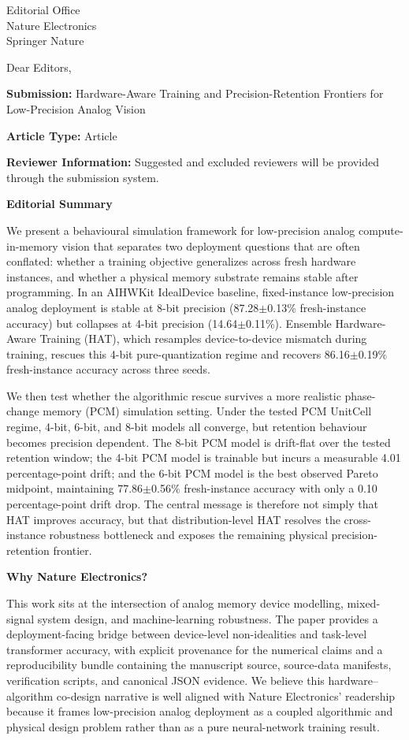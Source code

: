 \documentclass[11pt,a4paper]{letter}
\begin{document}
\begin{letter}{Editorial Office\\Nature Electronics\\Springer Nature}

\opening{Dear Editors,}

\textbf{Submission:} Hardware-Aware Training and Precision-Retention Frontiers for Low-Precision Analog Vision

\textbf{Article Type:} Article

\textbf{Reviewer Information:} Suggested and excluded reviewers will be provided through the submission system.

\vspace{0.5em}
\textbf{Editorial Summary}

We present a behavioural simulation framework for low-precision analog compute-in-memory vision that separates two deployment questions that are often conflated: whether a training objective generalizes across fresh hardware instances, and whether a physical memory substrate remains stable after programming. In an AIHWKit IdealDevice baseline, fixed-instance low-precision analog deployment is stable at 8-bit precision (87.28$\pm$0.13\% fresh-instance accuracy) but collapses at 4-bit precision (14.64$\pm$0.11\%). Ensemble Hardware-Aware Training (HAT), which resamples device-to-device mismatch during training, rescues this 4-bit pure-quantization regime and recovers 86.16$\pm$0.19\% fresh-instance accuracy across three seeds.

We then test whether the algorithmic rescue survives a more realistic phase-change memory (PCM) simulation setting. Under the tested PCM UnitCell regime, 4-bit, 6-bit, and 8-bit models all converge, but retention behaviour becomes precision dependent. The 8-bit PCM model is drift-flat over the tested retention window; the 4-bit PCM model is trainable but incurs a measurable 4.01 percentage-point drift; and the 6-bit PCM model is the best observed Pareto midpoint, maintaining 77.86$\pm$0.56\% fresh-instance accuracy with only a 0.10 percentage-point drift drop. The central message is therefore not simply that HAT improves accuracy, but that distribution-level HAT resolves the cross-instance robustness bottleneck and exposes the remaining physical precision-retention frontier.

\vspace{0.5em}
\textbf{Why Nature Electronics?}

This work sits at the intersection of analog memory device modelling, mixed-signal system design, and machine-learning robustness. The paper provides a deployment-facing bridge between device-level non-idealities and task-level transformer accuracy, with explicit provenance for the numerical claims and a reproducibility bundle containing the manuscript source, source-data manifests, verification scripts, and canonical JSON evidence. We believe this hardware--algorithm co-design narrative is well aligned with Nature Electronics' readership because it frames low-precision analog deployment as a coupled algorithmic and physical design problem rather than as a pure neural-network training result.


\end{letter}
\end{document}
